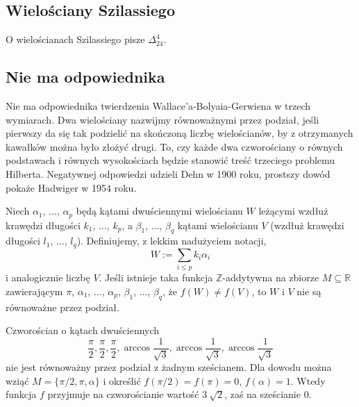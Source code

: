 \subsection{Wielościany Szilassiego}
O wielościanach Szilassiego pisze $\Delta_{24}^4$.





\subsection{Nie ma odpowiednika}
Nie ma odpowiednika twierdzenia Wallace'a-Bolyaia-Gerwiena w trzech wymiarach.
Dwa wielościany nazwijmy równoważnymi przez podział, jeśli pierwszy da się tak podzielić na skończoną liczbę wielościanów, by z otrzymanych kawałków można było złożyć drugi.
To, czy każde dwa czworościany o równych podstawach i równych wysokościach będzie stanowić treść trzeciego problemu Hilberta.
Negatywnej odpowiedzi udzieli Dehn w 1900 roku, prostszy dowód pokaże Hadwiger w 1954 roku.

\begin{theorem}[Hadwigera] %
    Niech $\alpha_1$, $\ldots$, $\alpha_p$ będą kątami dwuściennymi wielościanu $W$ leżącymi wzdłuż krawędzi długości $k_1$, $\ldots$, $k_p$, a $\beta_1$, $\ldots$, $\beta_q$ kątami wielościanu $V$ (wzdłuż krawędzi długości $l_1$, $\ldots$, $l_q$).
    Definiujemy, z lekkim nadużyciem notacji,
    \begin{equation}
        W := \sum_{i \le p} k_i \alpha_i
    \end{equation}
    i analogicznie liczbę $V$.
    Jeśli istnieje taka funkcja $\mathbb Z$-addytywna na zbiorze $M \subseteq \mathbb R$ zawierającym $\pi$, $\alpha_1$, $\ldots$, $\alpha_p$, $\beta_1$, $\ldots$, $\beta_q$, że $f(W) \neq f(V)$, to $W$ i $V$ nie są równoważne przez podział.
\end{theorem}

\begin{corollary}
    Czworościan o kątach dwuściennych
    \begin{equation}
        \frac \pi 2, \frac \pi 2, \frac \pi 2,
        \arccos \frac{1}{\sqrt 3}, \arccos \frac{1}{\sqrt 3}, \arccos \frac{1}{\sqrt 3}
    \end{equation}
    nie jest równoważny przez podział z żadnym sześcianem.
    Dla dowodu można wziąć $M = \{\pi/2, \pi, \alpha\}$ i określić $f(\pi/2) = f(\pi) = 0$, $f(\alpha) = 1$.
    Wtedy funkcja $f$ przyjmuje na czworościanie wartość $3 \ \sqrt 2$, zaś na sześcianie $0$.
\end{corollary}

